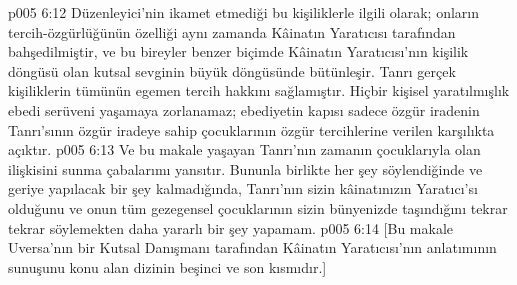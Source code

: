 \vs p005 6:12 Düzenleyici’nin ikamet etmediği bu kişiliklerle ilgili olarak; onların tercih\hyp{}özgürlüğünün özelliği aynı zamanda Kâinatın Yaratıcısı tarafından bahşedilmiştir, ve bu bireyler benzer biçimde Kâinatın Yaratıcısı’nın kişilik döngüsü olan kutsal sevginin büyük döngüsünde bütünleşir. Tanrı gerçek kişiliklerin tümünün egemen tercih hakkını sağlamıştır. Hiçbir kişisel yaratılmışlık ebedi serüveni yaşamaya zorlanamaz; ebediyetin kapısı sadece özgür iradenin Tanrı’sının özgür iradeye sahip çocuklarının özgür tercihlerine verilen karşılıkta açıktır.
\vs p005 6:13 Ve bu makale yaşayan Tanrı’nın zamanın çocuklarıyla olan ilişkisini sunma çabalarımı yansıtır. Bununla birlikte her şey söylendiğinde ve geriye yapılacak bir şey kalmadığında, Tanrı’nın sizin kâinatınızın Yaratıcı’sı olduğunu ve onun tüm gezegensel çocuklarının sizin bünyenizde taşındığını tekrar tekrar söylemekten daha yararlı bir şey yapamam.
\vs p005 6:14 [Bu makale Uversa’nın bir Kutsal Danışmanı tarafından Kâinatın Yaratıcısı’nın anlatımının sunuşunu konu alan dizinin beşinci ve son kısmıdır.]
